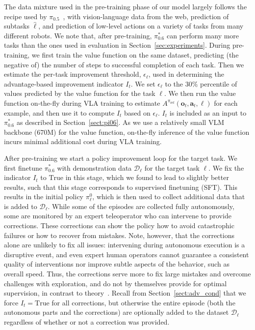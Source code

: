 \documentclass[conference]{IEEEtran}
\newcommand{\ba}{\mathbf{a}}
\newcommand{\bo}{\mathbf{o}}
\newcommand{\lang}{\ell}
\newcommand{\piref}{\pi_\text{ref}}
\newcommand{\rawtext}{\hat{\ell}} %
\def \Pizf {$\pi_{0.5}$}
\def \ModelSymbol {$\pi^{*}_{0.6}$}
\begin{document}
The data mixture used in the pre-training phase of our model largely follows the recipe used by \Pizf~\citep{black2025pi05}, with vision-language data from the web, prediction of subtasks $\rawtext$, and prediction of low-level actions on a variety of tasks from many different robots. We note that, after pre-training, \ModelSymbol{} can perform many more tasks than the ones used in evaluation in Section~\ref{sec:experiments}. During pre-training, we first train the value function on the same dataset, predicting (the negative of) the number of steps to successful completion of each task. Then we estimate the per-task improvement threshold, $\epsilon_\lang$, used in determining the advantage-based improvement indicator $I_t$. We set $\epsilon_\lang$ to the $30\%$ percentile of values predicted by the value function for the task $\lang$. We then run the value function on-the-fly during VLA training to estimate $A^{\piref}(\bo_t, \ba_t, \lang)$ for each example, and then use it to compute $I_t$ based on $\epsilon_\lang$. $I_t$ is included as an input to \ModelSymbol{} as described in Section~\ref{sect:pi06}. As we use a relatively small VLM backbone (670M) for the value function, on-the-fly inference of the value function incurs minimal additional cost during VLA training.






After pre-training we start a policy improvement loop for the target task. We first finetune \ModelSymbol{} with demonstration data $\mathcal{D}_{\lang}$ for the target task $\lang$. We fix the indicator $I_t$ to $\text{True}$ in this stage, which we found to lead to slightly better results, such that this stage corresponds to supervised finetuning (SFT). This results in the initial policy $\pi^0_{\lang}$, which is then used to collect additional data that is added to $\mathcal{D}_{\lang}$. While some of the episodes are collected fully autonomously, some are monitored by an expert teleoperator who can intervene to provide corrections. These corrections can show the policy how to avoid catastrophic failures or how to recover from mistakes. Note, however, that the corrections alone are unlikely to fix all issues: intervening during autonomous execution is a disruptive event, and even expert human operators cannot guarantee a consistent quality of interventions nor improve subtle aspects of the behavior, such as overall speed. Thus, the corrections serve more to fix large mistakes and overcome challenges with exploration, and do not by themselves provide for optimal supervision, in contrast to theory~\citep{ross2011dagger}. Recall from Section~\ref{sect:adv_cond} that we force $I_t = \text{True}$ for all corrections, but otherwise the entire episode (both the autonomous parts and the corrections) are optionally added to the dataset $\mathcal{D}_{\lang}$ regardless of whether or not a correction was provided.
\end{document}
